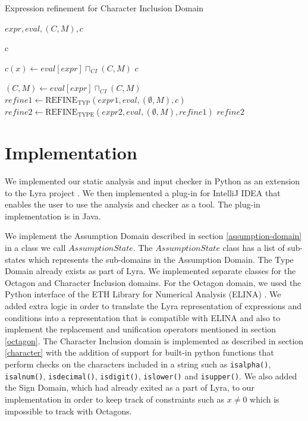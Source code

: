 \documentclass[10pt]{report}
\begin{document}
\begin{algorithm}[H]
	\caption{Expression refinement for Character Inclusion Domain} \label{refineC}
	\begin{algorithmic}
		 {$ expr, eval, (C, M), c$}
		
		\State \Return c
		\EndIf
		
		\State $ c(x) \gets eval[expr] \sqcap_{CI} (C, M)$
		\State \Return $ c $
		\EndIf
		
		\State $ (C, M) \gets eval[expr] \sqcap_{CI} (C, M)  $
		\State $ refine1 \gets \mathrm{REFINE}_{\mathrm{TYP}}(expr1, eval, (\emptyset, M), c) $
		\State $ refine2 \gets \mathrm{REFINE}_{\mathrm{TYPE}}(expr2, eval, (\emptyset, M), refine1) $
		\State \Return $ refine2 $
		\EndIf
		
		\EndFunction
	\end{algorithmic}
\end{algorithm}


\chapter{Implementation}

We implemented our static analysis and input checker in Python as an extension to the Lyra project \cite{lyra}. We then implemented a plug-in for IntelliJ IDEA that enables the user to use the analysis and checker as a tool. The plug-in implementation is in Java. 



We implement the Assumption Domain described in section \ref{assumption-domain} in a class we call $ AssumptionState $.  The $ AssumptionState $ class has a list of sub-states which represents the sub-domains in the Assumption Domain. The Type Domain already exists as part of Lyra. We implemented separate classes for the Octagon and Character Inclusion domains. For the Octagon domain, we used the Python interface of the ETH Library for Numerical Analysis (ELINA) \cite{singh}. We added extra logic in order to translate the Lyra representation of expressions and conditions into a representation that is compatible with ELINA and also to implement the replacement and unification operators mentioned in section \ref{octagon}. The Character Inclusion domain is implemented as described in section \ref{character} with the addition of support for built-in python functions that perform checks on the characters included in a string such as \verb|isalpha()|, \verb|isalnum()|, \verb|isdecimal()|, \verb|isdigit()|, \verb|islower()| and \verb|isupper()|. We also added the Sign Domain, which had already exited as a part of Lyra, to our implementation in order to keep track of constraints such as $ x \neq 0 $ which is impossible to track with Octagons. 
\end{document}
